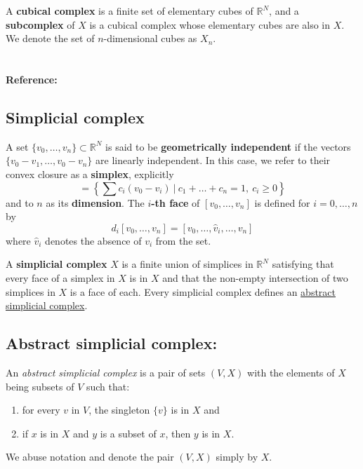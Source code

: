 \documentclass{amsart}
\begin{document}
	A \textbf{cubical complex} is a finite set of elementary cubes of $\mathbb{R}^N$, and a \textbf{subcomplex} of $X$ is a cubical complex whose elementary cubes are also in $X$. We denote the set of $n$-dimensional cubes as $X_n$.
	
	\paragraph{\\ Reference:} \cite{mischaikow04computational}
	
	\subsection*{Simplicial complex} \label{simplicial complex}

	A set $\{v_0, \dots, v_n\} \subset \mathbb{R}^N$ is said to be \textbf{geometrically independent} if the vectors $\{v_0-v_1, \dots, v_0-v_n\}$ are linearly independent. In this case, we refer to their convex closure as a \textbf{simplex}, explicitly
	\begin{equation*}
	[v_0,\dots ,v_n] = \left\{ \sum c_i (v_0 - v_i)\ \big|\ c_1+\dots+c_n = 1,\ c_i \geq 0 \right\}
	\end{equation*}
	and to $n$ as its \textbf{dimension}. The \textbf{$i$-th face} of $[v_0, \dots, v_n]$ is defined for $i=0, \dots, n$ by
	\begin{equation*}
	d_i[v_0, \dots, v_n] = [v_0, \dots, \widehat{v}_i, \dots, v_n]
	\end{equation*}
	where $\widehat{v}_i$ denotes the absence of $v_i$ from the set.
	
	A \textbf{simplicial complex} $X$ is a finite union of simplices in $\mathbb{R}^N$ satisfying that every face of a simplex in $X$ is in $X$ and that the non-empty intersection of two simplices in $X$ is a face of each. Every simplicial complex defines an \hyperref[abstract simplicial complex]{abstract simplicial complex}.
	
	\subsection*{Abstract simplicial complex:} \label{abstract simplicial complex}
	
	An \textit{abstract simplicial complex} is a pair of sets $(V, X)$ with the elements of $X$ being subsets of $V$ such that: 
	\begin{enumerate}
		\item for every $v$ in $V$, the singleton $\{v\}$ is in $X$ and
		\item if $x$ is in $X$ and $y$ is a subset of $x$, then $y$ is in $X$. 
	\end{enumerate}
	We abuse notation and denote the pair $(V, X)$ simply by $X$.
	
\end{document}
